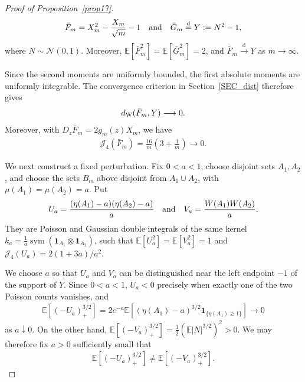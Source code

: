 \documentclass[letterpaper,11pt,reqno]{amsart}
\numberwithin{equation}{section}
\theoremstyle{plain}
\theoremstyle{definition}
\theoremstyle{remark}
\newcommand{\E}{\mathbb{E}}
\newcommand{\NN}{\mathcal{N}}
\newcommand{\ind}{\mathbf{1}}
\DeclareMathOperator{\sym}{sym}
\newcommand{\noi}{\noindent}
\newcommand{\ot}{\otimes}
\newcommand{\Jfour}{\mathcal J_4}
\newcommand{\dW}{d_{\rm W}}
\newcommand{\AND}{\quad{\rm and}\quad}
\begin{document}
\begin{proof}[Proof of Proposition~\ref{prop17}]
\noi
\begin{align*}
 \bar F_m
 =X_m^2-\frac{X_m}{\sqrt m}-1
\AND
 \bar G_m\stackrel{\mathrm d}=Y:=N^2-1,
\end{align*}
where $N\sim\NN(0,1)$.  Moreover,
$\E[\bar F_m^2]=\E[\bar G_m^2]=2$, and
$\bar F_m\xrightarrow{\mathrm d}Y$ as $m\to\infty$.

Since the second moments are uniformly bounded, the first absolute
moments are uniformly integrable.  The convergence criterion in
Section~\ref{SEC_dist} therefore gives
\noi
\begin{align}
 \dW(\bar F_m,Y)\longrightarrow0.
 \label{metric_base_W}
\end{align}
Moreover,
with
$D_z\bar F_m=2g_m(z)X_m$,
we have
\noi
\begin{align}
 \Jfour(\bar F_m)
 =
 \frac{16}{m}\left(3+\frac1m\right)
 \longrightarrow0.
 \label{metric_base_J4}
\end{align}

We next construct a fixed perturbation.  Fix $0<a<1$, choose
disjoint sets $A_1,A_2$, and choose the sets $B_m$ above disjoint from
$A_1\cup A_2$, with
$\mu(A_1)=\mu(A_2)=a$.  Put
\noi
\begin{align*}
 U_a
 =
 \frac{(\eta(A_1)-a)(\eta(A_2)-a)}{a}
 \AND
 V_a
 =
 \frac{W(A_1)W(A_2)}{a}.
\end{align*}
They are Poisson and Gaussian double integrals of the same kernel
$k_a =
 \frac1a\sym(\ind_{A_1}\ot\ind_{A_2})
 $,
such that $\E[U_a^2]=\E[V_a^2]=1$
and
$\Jfour(U_a)=2(1+3a)/a^2$.


We choose $a$ so that $U_a$ and $V_a$ can be distinguished near the
left endpoint $-1$ of the support of $Y$.  Since $0<a<1$, $U_a<0$
precisely when exactly one of the two Poisson counts vanishes, and
\noi
\begin{align*}
 \E[(-U_a)_+^{3/2}]
 =
 2e^{-a}
 \E\left[
 (\eta(A_1)-a)^{3/2}
 \ind_{\{\eta(A_1)\geq1\}}
 \right]
 \longrightarrow0
\end{align*}
as $a\downarrow0$.  On the other hand,
$\E[(-V_a)_+^{3/2}]
=\frac12(\E|N|^{3/2})^2>0$.
We may therefore fix $a>0$ sufficiently small that
\noi
\begin{align}
 \E[(-U_a)_+^{3/2}]
 \neq
 \E[(-V_a)_+^{3/2}].
 \label{metric_moment_sep}
\end{align}


\end{proof}
\end{document}
